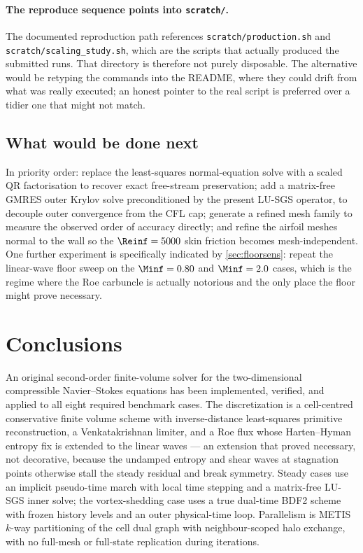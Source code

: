 \paragraph{The reproduce sequence points into \texttt{scratch/}.} The documented
reproduction path references \texttt{scratch/production.sh} and
\texttt{scratch/scaling\_study.sh}, which are the scripts that actually produced
the submitted runs. That directory is therefore not purely disposable. The
alternative would be retyping the commands into the README, where they could drift
from what was really executed; an honest pointer to the real script is preferred
over a tidier one that might not match.

\subsection{What would be done next}

In priority order: replace the least-squares normal-equation solve with a scaled
QR factorisation to recover exact free-stream preservation; add a matrix-free
GMRES outer Krylov solve preconditioned by the present LU-SGS operator, to
decouple outer convergence from the CFL cap; generate a refined mesh family to
measure the observed order of accuracy directly; and refine the airfoil meshes
normal to the wall so the $\Reinf=5000$ skin friction becomes mesh-independent.
One further experiment is specifically indicated by \cref{sec:floorsens}: repeat
the linear-wave floor sweep on the $\Minf=0.80$ and $\Minf=2.0$ cases, which is
the regime where the Roe carbuncle is actually notorious and the only place the
floor might prove necessary.

\section{Conclusions}
\label{sec:conclusions}

An original second-order finite-volume solver for the two-dimensional compressible
Navier--Stokes equations has been implemented, verified, and applied to all eight
required benchmark cases. The discretization is a cell-centred conservative finite
volume scheme with inverse-distance least-squares primitive reconstruction, a
Venkatakrishnan limiter, and a Roe flux whose Harten--Hyman entropy fix is extended
to the linear waves --- an extension that proved necessary, not decorative, because
the undamped entropy and shear waves at stagnation points otherwise stall the
steady residual and break symmetry. Steady cases use an implicit pseudo-time march
with local time stepping and a matrix-free LU-SGS inner solve; the vortex-shedding
case uses a true dual-time BDF2 scheme with frozen history levels and an outer
physical-time loop. Parallelism is METIS $k$-way partitioning of the cell dual
graph with neighbour-scoped halo exchange, with no full-mesh or full-state
replication during iterations.

